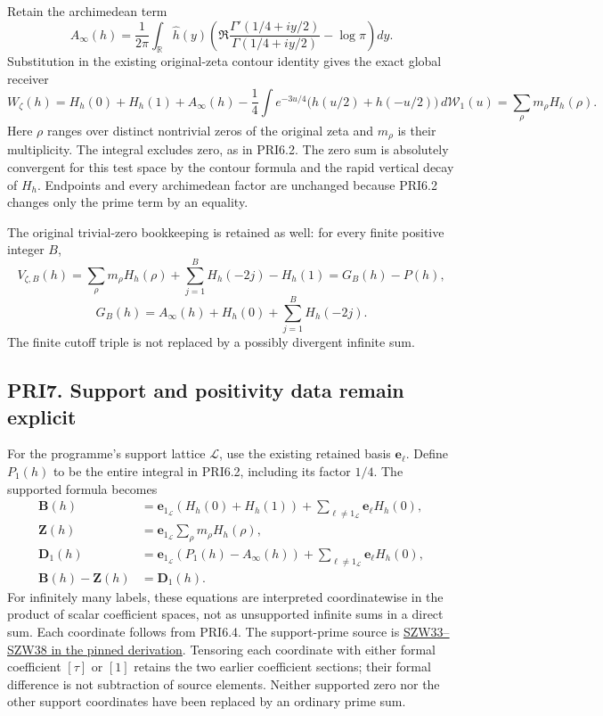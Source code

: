 \documentclass[
]{article}
\begin{document}
Retain the archimedean term \[
A_\infty(h)=\frac1{2\pi}\int_{\mathbb R}\widehat h(y)
\left(\Re\frac{\Gamma'(1/4+iy/2)}{\Gamma(1/4+iy/2)}-\log\pi\right)dy.
\tag{PRI6.3}
\] Substitution in the existing original-zeta contour identity gives the
exact global receiver \[
\boxed{W_\zeta(h)=H_h(0)+H_h(1)+A_\infty(h)
-\frac14\int e^{-3u/4}\bigl(h(u/2)+h(-u/2)\bigr)\,d\mathcal W_1(u)
=\sum_\rho m_\rho H_h(\rho).}
\tag{PRI6.4}
\] Here \(\rho\) ranges over distinct nontrivial zeros of the original
zeta and \(m_\rho\) is their multiplicity. The integral excludes zero,
as in PRI6.2. The zero sum is absolutely convergent for this test space
by the contour formula and the rapid vertical decay of \(H_h\).
Endpoints and every archimedean factor are unchanged because PRI6.2
changes only the prime term by an equality.

The original trivial-zero bookkeeping is retained as well: for every
finite positive integer \(B\), \[
V_{\zeta,B}(h)=\sum_\rho m_\rho H_h(\rho)
+\sum_{j=1}^B H_h(-2j)-H_h(1)
=G_B(h)-P(h),
\] \[
G_B(h)=A_\infty(h)+H_h(0)+\sum_{j=1}^B H_h(-2j).
\tag{PRI6.5}
\] The finite cutoff triple is not replaced by a possibly divergent
infinite sum.

\subsection{PRI7. Support and positivity data remain
explicit}\label{pri7.-support-and-positivity-data-remain-explicit}

For the programme's support lattice \(\mathcal L\), use the existing
retained basis \(\mathbf e_\ell\). Define \(P_1(h)\) to be the entire
integral in PRI6.2, including its factor \(1/4\). The supported formula
becomes \[
\begin{split}
\boldsymbol B(h)&=\mathbf e_{1_{\mathcal L}}(H_h(0)+H_h(1))
+\sum_{\ell\ne1_{\mathcal L}}\mathbf e_\ell H_h(0),\\
\boldsymbol Z(h)&=\mathbf e_{1_{\mathcal L}}\sum_\rho m_\rho H_h(\rho),\\
\boldsymbol D_1(h)&=\mathbf e_{1_{\mathcal L}}(P_1(h)-A_\infty(h))
+\sum_{\ell\ne1_{\mathcal L}}\mathbf e_\ell H_h(0),\\
\boldsymbol B(h)-\boldsymbol Z(h)&=\boldsymbol D_1(h).
\end{split}
\tag{PRI7.1}
\] For infinitely many labels, these equations are interpreted
coordinatewise in the product of scalar coefficient spaces, not as
unsupported infinite sums in a direct sum. Each coordinate follows from
PRI6.4. The support-prime source is
\href{https://github.com/KokunoYumeto/zeta-function-research-reader/blob/76f421965914beb133df797835f940849844dc4f/workbenches/splitzero-tandem/branches/tau-zero-prime-positivity/SUPPORTED_ZERO_PRIME_WEIL_DERIVATION.md}{SZW33--SZW38
in the pinned derivation}. Tensoring each coordinate with either formal
coefficient \([\tau]\) or \([1]\) retains the two earlier coefficient
sections; their formal difference is not subtraction of source elements.
Neither supported zero nor the other support coordinates have been
replaced by an ordinary prime sum.
\end{document}
